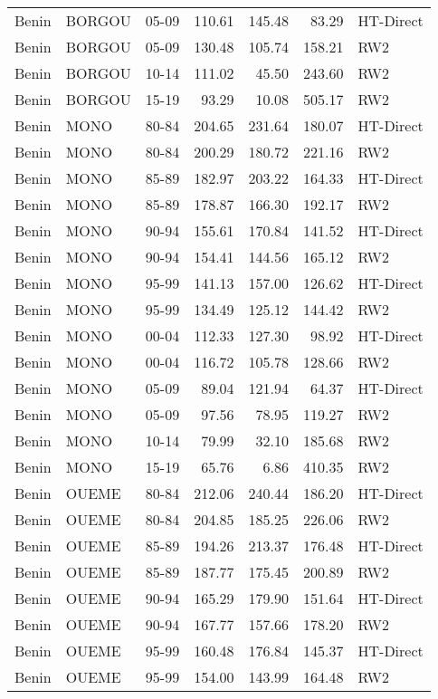 \begin{longtable}{lllrrrl}
  Benin & BORGOU & 05-09 & 110.61 & 145.48 & 83.29 & HT-Direct \\ 
  Benin & BORGOU & 05-09 & 130.48 & 105.74 & 158.21 & RW2 \\ 
  Benin & BORGOU & 10-14 & 111.02 & 45.50 & 243.60 & RW2 \\ 
  Benin & BORGOU & 15-19 & 93.29 & 10.08 & 505.17 & RW2 \\ 
  Benin & MONO & 80-84 & 204.65 & 231.64 & 180.07 & HT-Direct \\ 
  Benin & MONO & 80-84 & 200.29 & 180.72 & 221.16 & RW2 \\ 
  Benin & MONO & 85-89 & 182.97 & 203.22 & 164.33 & HT-Direct \\ 
  Benin & MONO & 85-89 & 178.87 & 166.30 & 192.17 & RW2 \\ 
  Benin & MONO & 90-94 & 155.61 & 170.84 & 141.52 & HT-Direct \\ 
  Benin & MONO & 90-94 & 154.41 & 144.56 & 165.12 & RW2 \\ 
  Benin & MONO & 95-99 & 141.13 & 157.00 & 126.62 & HT-Direct \\ 
  Benin & MONO & 95-99 & 134.49 & 125.12 & 144.42 & RW2 \\ 
  Benin & MONO & 00-04 & 112.33 & 127.30 & 98.92 & HT-Direct \\ 
  Benin & MONO & 00-04 & 116.72 & 105.78 & 128.66 & RW2 \\ 
  Benin & MONO & 05-09 & 89.04 & 121.94 & 64.37 & HT-Direct \\ 
  Benin & MONO & 05-09 & 97.56 & 78.95 & 119.27 & RW2 \\ 
  Benin & MONO & 10-14 & 79.99 & 32.10 & 185.68 & RW2 \\ 
  Benin & MONO & 15-19 & 65.76 & 6.86 & 410.35 & RW2 \\ 
  Benin & OUEME & 80-84 & 212.06 & 240.44 & 186.20 & HT-Direct \\ 
  Benin & OUEME & 80-84 & 204.85 & 185.25 & 226.06 & RW2 \\ 
  Benin & OUEME & 85-89 & 194.26 & 213.37 & 176.48 & HT-Direct \\ 
  Benin & OUEME & 85-89 & 187.77 & 175.45 & 200.89 & RW2 \\ 
  Benin & OUEME & 90-94 & 165.29 & 179.90 & 151.64 & HT-Direct \\ 
  Benin & OUEME & 90-94 & 167.77 & 157.66 & 178.20 & RW2 \\ 
  Benin & OUEME & 95-99 & 160.48 & 176.84 & 145.37 & HT-Direct \\ 
  Benin & OUEME & 95-99 & 154.00 & 143.99 & 164.48 & RW2 \\ 

\end{longtable}

